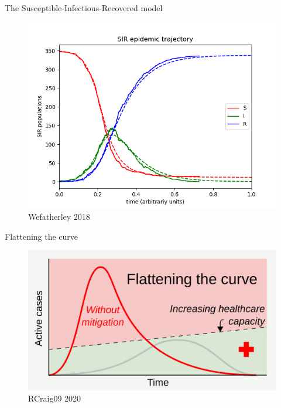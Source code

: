 \documentclass[
  ignorenonframetext,
  aspectratio=1610,
]{beamer}
\begin{document}
\begin{frame}{The Susceptible-Infectious-Recovered model}
\protect\hypertarget{the-susceptible-infectious-recovered-model}{}
\begin{figure}
\centering
\includegraphics[width=\textwidth,height=0.8\textheight]{exhibit/fig/SIR_trajectory.png}
\caption{Wefatherley 2018}
\end{figure}
\end{frame}

\begin{frame}{Flattening the curve}
\protect\hypertarget{flattening-the-curve}{}
\begin{figure}
\centering
\includegraphics{exhibit/fig/flatten1.png}
\caption{RCraig09 2020}
\end{figure}
\end{frame}
\end{document}
